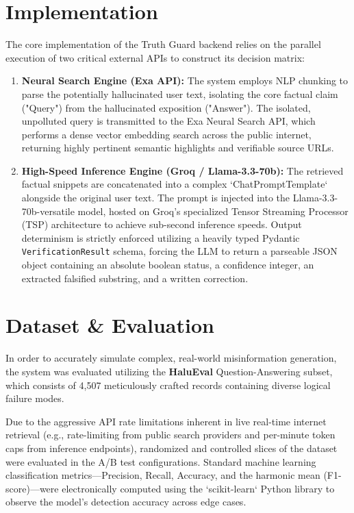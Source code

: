 \documentclass[conference]{IEEEtran}
\begin{document}
\section{Implementation}
The core implementation of the Truth Guard backend relies on the parallel execution of two critical external APIs to construct its decision matrix:

\begin{enumerate}
    \item \textbf{Neural Search Engine (Exa API):} The system employs NLP chunking to parse the potentially hallucinated user text, isolating the core factual claim ("Query") from the hallucinated exposition ("Answer"). The isolated, unpolluted query is transmitted to the Exa Neural Search API, which performs a dense vector embedding search across the public internet, returning highly pertinent semantic highlights and verifiable source URLs.
    \item \textbf{High-Speed Inference Engine (Groq / Llama-3.3-70b):} The retrieved factual snippets are concatenated into a complex `ChatPromptTemplate` alongside the original user text. The prompt is injected into the Llama-3.3-70b-versatile model, hosted on Groq's specialized Tensor Streaming Processor (TSP) architecture to achieve sub-second inference speeds. Output determinism is strictly enforced utilizing a heavily typed Pydantic \texttt{VerificationResult} schema, forcing the LLM to return a parseable JSON object containing an absolute boolean status, a confidence integer, an extracted falsified substring, and a written correction.
\end{enumerate}

\section{Dataset \& Evaluation}
In order to accurately simulate complex, real-world misinformation generation, the system was evaluated utilizing the \textbf{HaluEval} Question-Answering subset, which consists of 4,507 meticulously crafted records containing diverse logical failure modes.

Due to the aggressive API rate limitations inherent in live real-time internet retrieval (e.g., rate-limiting from public search providers and per-minute token caps from inference endpoints), randomized and controlled slices of the dataset were evaluated in the A/B test configurations. Standard machine learning classification metrics—Precision, Recall, Accuracy, and the harmonic mean (F1-score)—were electronically computed using the `scikit-learn` Python library to observe the model's detection accuracy across edge cases.
\end{document}
